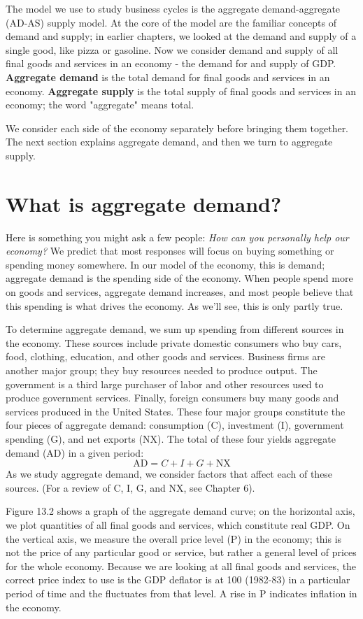 \documentclass[11pt]{article} %
\begin{document}
The model we use to study business cycles is the aggregate demand-aggregate (AD-AS) supply model. At the core of the model are the familiar concepts of demand and supply; in earlier chapters, we looked at the demand and supply of a single good, like pizza or gasoline. Now we consider demand and supply of all final goods and services in an economy - the demand for and supply of GDP. \textbf{Aggregate demand} is the total demand for final goods and services in an economy. \textbf{Aggregate supply} is the total supply of final goods and services in an economy; the word "aggregate" means total.

We consider each side of the economy separately before bringing them together. The next section explains aggregate demand, and then we turn to aggregate supply.

\section*{\textbf{What is aggregate demand?}}
Here is something you might ask a few people: \textit{How can you personally help our economy?} We predict that most responses will focus on buying something or spending money somewhere. In our model of the economy, this is demand; aggregate demand is the spending side of the economy. When people spend more on goods and services, aggregate demand increases, and most people believe that this spending is what drives the economy. As we'll see, this is only partly true.

To determine aggregate demand, we sum up spending from different sources in the economy. These sources include private domestic consumers who buy cars, food, clothing, education, and other goods and services. Business firms are another major group; they buy resources needed to produce output. The government is a third large purchaser of labor and other resources used to produce government services. Finally, foreign consumers buy many goods and services produced in the United States. These four major groups constitute the four pieces of aggregate demand: consumption (C), investment (I), government spending (G), and net exports (NX). The total of these four yields aggregate demand (AD) in a given period:
\begin{equation}
\text{AD} = C + I + G + \text{NX}
\end{equation}
As we study aggregate demand, we consider factors that affect each of these sources. (For a review of C, I, G, and NX, see Chapter 6).

Figure 13.2 shows a graph of the aggregate demand curve; on the horizontal axis, we plot quantities of all final goods and services, which constitute real GDP. On the vertical axis, we measure the overall price level (P) in the economy; this is not the price of any particular good or service, but rather a general level of prices for the whole economy. Because we are looking at all final goods and services, the correct price index to use is the GDP deflator is at 100 (1982-83) in a particular period of time and the fluctuates from that level. A rise in P indicates inflation in the economy.
\end{document}

